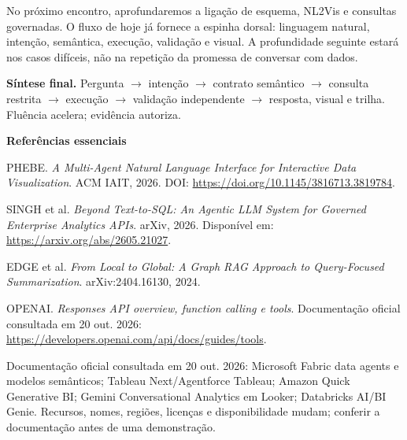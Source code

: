 No próximo encontro, aprofundaremos a ligação de esquema, NL2Vis e consultas governadas. O fluxo de hoje já fornece a espinha dorsal: linguagem natural, intenção, semântica, execução, validação e visual. A profundidade seguinte estará nos casos difíceis, não na repetição da promessa de conversar com dados.

\begin{SummaryBox}
\textbf{Síntese final.} Pergunta $\rightarrow$ intenção $\rightarrow$ contrato semântico $\rightarrow$ consulta restrita $\rightarrow$ execução $\rightarrow$ validação independente $\rightarrow$ resposta, visual e trilha. Fluência acelera; evidência autoriza.
\end{SummaryBox}

\bigskip
\noindent\textbf{Referências essenciais}

\begingroup\small

PHEBE. \textit{A Multi-Agent Natural Language Interface for Interactive Data Visualization}. ACM IAIT, 2026. DOI: \url{https://doi.org/10.1145/3816713.3819784}.

SINGH et al. \textit{Beyond Text-to-SQL: An Agentic LLM System for Governed Enterprise Analytics APIs}. arXiv, 2026. Disponível em: \url{https://arxiv.org/abs/2605.21027}.

EDGE et al. \textit{From Local to Global: A Graph RAG Approach to Query-Focused Summarization}. arXiv:2404.16130, 2024.

OPENAI. \textit{Responses API overview, function calling e tools}. Documentação oficial consultada em 20 out. 2026: \url{https://developers.openai.com/api/docs/guides/tools}.

Documentação oficial consultada em 20 out. 2026: Microsoft Fabric data agents e modelos semânticos; Tableau Next/Agentforce Tableau; Amazon Quick Generative BI; Gemini Conversational Analytics em Looker; Databricks AI/BI Genie. Recursos, nomes, regiões, licenças e disponibilidade mudam; conferir a documentação antes de uma demonstração.

\endgroup
